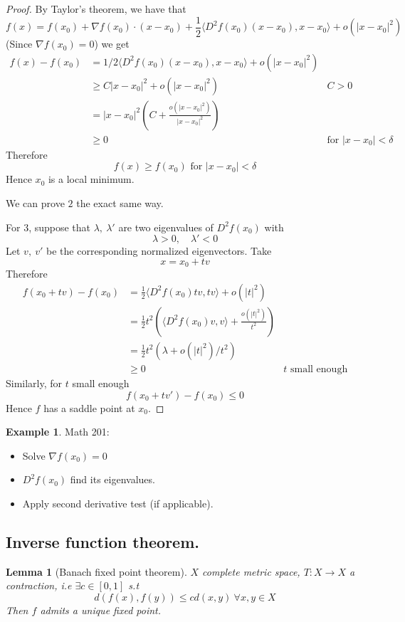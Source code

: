 \documentclass[11pt,a4paper]{article}
\theoremstyle{definition}
\newtheorem{example}[definition]{Example}
\theoremstyle{plain}
\newtheorem{lemma}[definition]{Lemma}
\theoremstyle{remark}
\newcommand{\angles}[1]{\langle #1 \rangle}
\begin{document}
\begin{proof}
    By Taylor's theorem, we have that 
    $$f(x) = f(x_0) + \nabla f(x_0) \cdot (x-x_0) + \frac{1}{2}\angles{D^2f(x_0) (x-x_0), x-x_0} + o(|x-x_0|^2)$$
    (Since $\nabla f(x_0) = 0$) we get  
    \begin{align*}
        f(x)- f(x_0) &= 1/2 \angles{D^2f(x_0) (x-x_0), x-x_0} + o(|x-x_0|^2) \\
        &\ge C |x-x_0|^2 + o(|x-x_0|^2)& C > 0 \\
        &= |x-x_0|^2 \left(C + \frac{o(|x-x_0|^2)}{|x-x_0|^2}\right) \\
        &\ge 0 &\text{for $|x-x_0| < \delta$}
    \end{align*}
    Therefore 
    $$f(x) \ge f(x_0) \text{ for $|x-x_0| < \delta$}$$
    Hence $x_0$ is a local minimum.

    We can prove $2$ the exact same way. 

    For $3$, suppose that $\lambda, \ \lambda'$ are two eigenvalues of $D^2f(x_0)$ with 
    $$\lambda > 0, \quad \lambda' < 0$$
    Let $v, \ v'$ be the corresponding normalized eigenvectors. Take 
    $$x = x_0 + tv$$
    Therefore 
    \begin{align*}
        f(x_0 + tv) - f(x_0) &= \frac{1}{2} \angles{D^2f(x_0)tv, tv} + o(|t|^2) \\
        &= \frac{1}{2} t^2 \left(\angles{D^2f(x_0)v, v} + \frac{o(|t|^2)}{t^2}\right) \\
        &= \frac{1}{2} t^2 \left(\lambda + o(|t|^2)/t^2\right) \\
        &\ge 0 &\text{$t$ small enough}
    \end{align*}
    Similarly, for $t$ small enough
    $$f(x_0 + tv') - f(x_0) \le 0$$
    Hence $f$ has a saddle point at $x_0$.
\end{proof}

\begin{example}
    Math 201: 
    \begin{itemize}
        \item Solve $\nabla f(x_0) = 0$
        \item $D^2f(x_0)$ find its eigenvalues. 
        \item Apply second derivative test (if applicable). 
    \end{itemize}
\end{example}

\subsection{Inverse function theorem.}
\begin{lemma}[Banach fixed point theorem]
    $X$ complete metric space, $T \colon X \to X$ a contraction, i.e $\exists c \in [0,1]$ s.t 
    $$d(f(x),f(y)) \le c d(x,y) \ \forall x, y \in X$$
    Then $f$ admits a unique fixed point.
\end{lemma}
\end{document}
